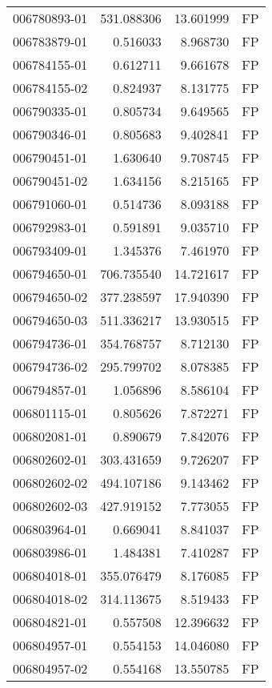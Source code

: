 \begin{tabular}{lrrl}
006780893-01 &  531.088306 &    13.601999 &   FP \\
006783879-01 &    0.516033 &     8.968730 &   FP \\
006784155-01 &    0.612711 &     9.661678 &   FP \\
006784155-02 &    0.824937 &     8.131775 &   FP \\
006790335-01 &    0.805734 &     9.649565 &   FP \\
006790346-01 &    0.805683 &     9.402841 &   FP \\
006790451-01 &    1.630640 &     9.708745 &   FP \\
006790451-02 &    1.634156 &     8.215165 &   FP \\
006791060-01 &    0.514736 &     8.093188 &   FP \\
006792983-01 &    0.591891 &     9.035710 &   FP \\
006793409-01 &    1.345376 &     7.461970 &   FP \\
006794650-01 &  706.735540 &    14.721617 &   FP \\
006794650-02 &  377.238597 &    17.940390 &   FP \\
006794650-03 &  511.336217 &    13.930515 &   FP \\
006794736-01 &  354.768757 &     8.712130 &   FP \\
006794736-02 &  295.799702 &     8.078385 &   FP \\
006794857-01 &    1.056896 &     8.586104 &   FP \\
006801115-01 &    0.805626 &     7.872271 &   FP \\
006802081-01 &    0.890679 &     7.842076 &   FP \\
006802602-01 &  303.431659 &     9.726207 &   FP \\
006802602-02 &  494.107186 &     9.143462 &   FP \\
006802602-03 &  427.919152 &     7.773055 &   FP \\
006803964-01 &    0.669041 &     8.841037 &   FP \\
006803986-01 &    1.484381 &     7.410287 &   FP \\
006804018-01 &  355.076479 &     8.176085 &   FP \\
006804018-02 &  314.113675 &     8.519433 &   FP \\
006804821-01 &    0.557508 &    12.396632 &   FP \\
006804957-01 &    0.554153 &    14.046080 &   FP \\
006804957-02 &    0.554168 &    13.550785 &   FP \\

\end{tabular}
